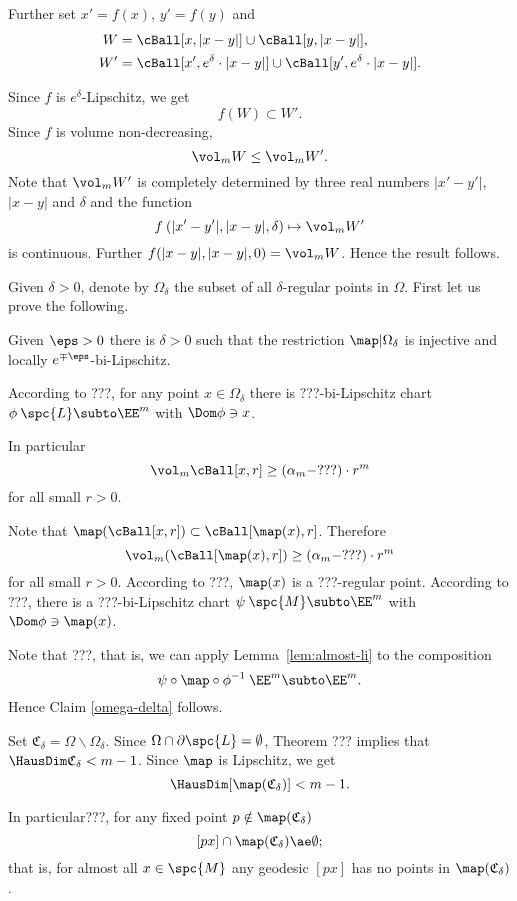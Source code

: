 Further set $x'=f(x)$, $y'=f(y)$
and %
\begin{align*}
W&=\cBall[x,|x-y|]\cup\cBall[y,|x-y|],
\\
W'&=\cBall[x',e^\delta\cdot|x-y|]\cup\cBall[y',e^\delta\cdot|x-y|].
\end{align*}

Since $f$ is $e^\delta$-Lipschitz, we get
\[f(W)\subset W'.\]
Since $f$ is volume non-decreasing,
\[\vol_m W
\le
\vol_mW'.
\]
Note that $\vol_mW'$ is completely determined by three real numbers
$|x'-y'|$, $|x-y|$ and $\delta$ and the function
\[f\:(|x'-y'|,|x-y|,\delta)\mapsto\vol_mW'\] is continuous.
Further $f(|x-y|,|x-y|,0)=\vol_mW$.
Hence the result follows.
\qeds

Given $\delta>0$,
denote by $\Omega_\delta$ the subset of all $\delta$-regular points in $\Omega$.
First let us prove the following.

\begin{clm}{}\label{omega-delta}
Given $\eps>0$ there is $\delta>0$
such that the restriction $\map|\Omega_\delta$ is injective and locally $e^{\mp\eps}$-bi-Lipschitz.
\end{clm}

According to ???,
for any point $x\in \Omega_\delta$ 
there is ???-bi-Lipschitz chart $\phi\:\spc{L}\subto\EE^m$
with $\Dom\phi\ni x$.

In particular 
\[\vol_m\cBall[x,r]\ge (\alpha_m-???)\cdot r^m\]
for all small $r>0$.

Note that $\map(\cBall[x,r])\subset \cBall[\map(x),r]$.
Therefore 
\[\vol_m(\cBall[\map(x),r])
\ge
(\alpha_m-???)\cdot r^m\]
for all small $r>0$.
According to ???, $\map(x)$ is a ???-regular point.
According to ???, there is a ???-bi-Lipschitz chart $\psi\:\spc{M}\subto\EE^m$
with $\Dom\phi\ni \map(x)$.

Note that ???,
that is, we can apply Lemma~\ref{lem:almost-li}
to the composition 
\[\psi\circ\map\circ\phi^{-1}\:\EE^m\subto\EE^m.\]
Hence Claim \ref{omega-delta} follows.


Set $\mathfrak{C}_\delta=\Omega\backslash \Omega_\delta$.
Since $\Omega\cap\partial\spc{L}=\emptyset$,
Theorem ??? implies that $\HausDim\mathfrak{C}_\delta<m-1$.
Since $\map$ is Lipschitz, we get 
\[\HausDim[\map(\mathfrak{C}_\delta)]<m-1.\]

In particular???, for any fixed point $p\notin\map(\mathfrak{C}_\delta)$
\[[px]\cap \map(\mathfrak{C}_\delta)\ae\emptyset;\]
that is, for almost all $x\in\spc{M}$ any geodesic $[px]$ has no points in $\map(\mathfrak{C}_\delta)$.

